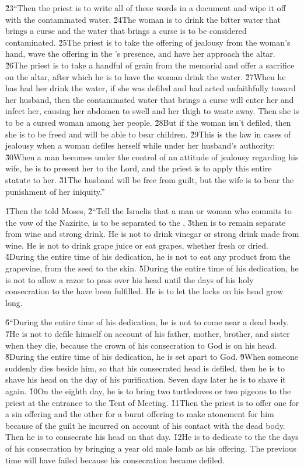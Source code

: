 \v{23}``Then the priest is to write all of these words in a document and wipe it off with the contaminated water. \v{24}The woman is to drink the bitter water that brings a curse and the water that brings a curse is to be considered contaminated. \v{25}The priest is to take the offering of jealousy from the woman's hand, wave the offering in the 's presence, and have her approach the altar. \v{26}The priest is to take a handful of grain from the memorial and offer a sacrifice on the altar, after which he is to have the woman drink the water. \v{27}When he has had her drink the water, if she was defiled and had acted unfaithfully toward her husband, then the contaminated water that brings a curse will enter her and infect her, causing her abdomen to swell and her thigh to waste away. Then she is to be a cursed woman among her people. \v{28}But if the woman isn't defiled, then she is to be freed and will be able to bear children. \v{29}This is the law in cases of jealousy when a woman defiles herself while under her husband's authority: \v{30}When a man becomes under the control of an attitude of jealousy regarding his wife, he is to present her to the Lord, and the priest is to apply this entire statute to her. \v{31}The husband will be free from guilt, but the wife is to bear the punishment of her iniquity.''

\v{1}Then the  told Moses, \v{2}``Tell the Israelis that a man or woman who commits to the vow of the Nazirite, is to be separated to the , \v{3}then is to remain separate from wine and strong drink. He is not to drink vinegar or strong drink made from wine. He is not to drink grape juice or eat grapes, whether fresh or dried. \v{4}During the entire time of his dedication, he is not to eat any product from the grapevine, from the seed to the skin. \v{5}During the entire time of his dedication, he is not to allow a razor to pass over his head until the days of his holy consecration to the  have been fulfilled. He is to let the locks on his head grow long.

\v{6}``During the entire time of his dedication, he is not to come near a dead body. \v{7}He is not to defile himself on account of his father, mother, brother, and sister when they die, because the crown of his consecration to God is on his head. \v{8}During the entire time of his dedication, he is set apart to God. \v{9}When someone suddenly dies beside him, so that his consecrated head is defiled, then he is to shave his head on the day of his purification. Seven days later he is to shave it again. \v{10}On the eighth day, he is to bring two turtledoves or two pigeons to the priest at the entrance to the Tent of Meeting. \v{11}Then the priest is to offer one for a sin offering and the other for a burnt offering to make atonement for him because of the guilt he incurred on account of his contact with the dead body. Then he is to consecrate his head on that day. \v{12}He is to dedicate to the  the days of his consecration by bringing a year old male lamb as his offering. The previous time will have failed because his consecration became defiled.

